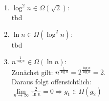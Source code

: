 \documentclass[11pt,a4paper,ngerman]{article}
\begin{document}
\begin{description}
\begin{enumerate}
\item
$\log^2 n \in \Omega (\sqrt{2})$: \\
tbd

\item
$\ln n \in \Omega (\log^2 n)$: \\
tbd

\item
$n^{\frac{1}{\log n}} \in \Omega (\ln n)$: \\
Zunächst gilt: $n^{\frac{1}{\log n}} = 2^{\frac{\log n}{\log n}} = 2$.\\
Daraus folgt offensichtlich:\\
$\underset{n\rightarrow\infty}{\lim} \frac{2}{\ln n} = 0 \Rightarrow g_1 \in \Omega (g_2)$

\end{enumerate}
\end{description}
\end{document}
